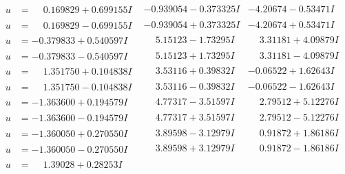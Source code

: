 \documentclass[1p]{elsarticle_modified}
\theoremstyle{definition}
\begin{document}
$$\begin{array}{c|c|c}
\begin{aligned}
u &= \phantom{-}0.169829 + 0.699155 I\end{aligned}
 & -0.939054 - 0.373325 I & -4.20674 - 0.53471 I \\ \hline\begin{aligned}
u &= \phantom{-}0.169829 - 0.699155 I\end{aligned}
 & -0.939054 + 0.373325 I & -4.20674 + 0.53471 I \\ \hline\begin{aligned}
u &= -0.379833 + 0.540597 I\end{aligned}
 & \phantom{-}5.15123 - 1.73295 I & \phantom{-}3.31181 + 4.09879 I \\ \hline\begin{aligned}
u &= -0.379833 - 0.540597 I\end{aligned}
 & \phantom{-}5.15123 + 1.73295 I & \phantom{-}3.31181 - 4.09879 I \\ \hline\begin{aligned}
u &= \phantom{-}1.351750 + 0.104838 I\end{aligned}
 & \phantom{-}3.53116 + 0.39832 I & -0.06522 + 1.62643 I \\ \hline\begin{aligned}
u &= \phantom{-}1.351750 - 0.104838 I\end{aligned}
 & \phantom{-}3.53116 - 0.39832 I & -0.06522 - 1.62643 I \\ \hline\begin{aligned}
u &= -1.363600 + 0.194579 I\end{aligned}
 & \phantom{-}4.77317 - 3.51597 I & \phantom{-}2.79512 + 5.12276 I \\ \hline\begin{aligned}
u &= -1.363600 - 0.194579 I\end{aligned}
 & \phantom{-}4.77317 + 3.51597 I & \phantom{-}2.79512 - 5.12276 I \\ \hline\begin{aligned}
u &= -1.360050 + 0.270550 I\end{aligned}
 & \phantom{-}3.89598 - 3.12979 I & \phantom{-}0.91872 + 1.86186 I \\ \hline\begin{aligned}
u &= -1.360050 - 0.270550 I\end{aligned}
 & \phantom{-}3.89598 + 3.12979 I & \phantom{-}0.91872 - 1.86186 I \\ \hline\begin{aligned}
u &= \phantom{-}1.39028 + 0.28253 I\end{aligned}

\end{array}$$
\end{document}
